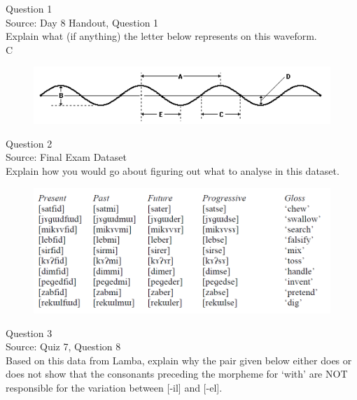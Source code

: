 \documentclass[12pt]{article}
\begin{document}
{\large Question 1}\\

Source: Day 8 Handout, Question 1\\

Explain what (if anything) the letter below represents on this waveform.\\

C

\begin{figure}[H]
\includegraphics{../images/sinusoid.png}
\end{figure}

\newpage

{\large Question 2}\\

Source: Final Exam Dataset\\

Explain how you would go about figuring out what to analyse in this dataset.\\

\begin{figure}[H]
\includegraphics{../images/final_dataset.png}
\end{figure}

\newpage

{\large Question 3}\\

Source: Quiz 7, Question 8\\

Based on this data from Lamba, explain why the pair given below either does or does not show that the consonants preceding the morpheme for `with' are NOT responsible for the variation between [-il] and [-el].\\
\end{document}
